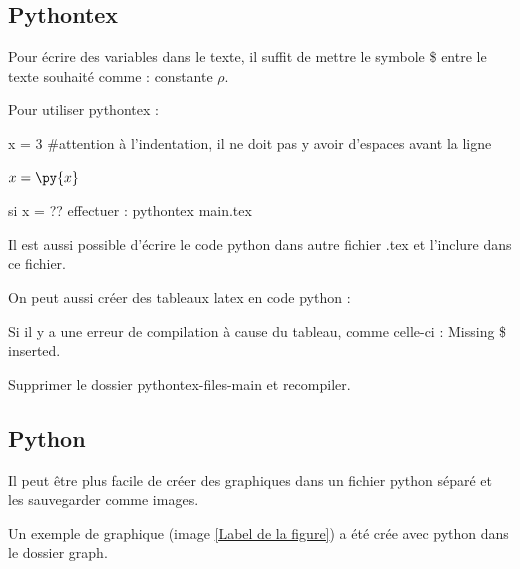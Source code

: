 \subsection{Pythontex}

Pour écrire des variables dans le texte, il suffit de mettre le symbole \$ entre le texte souhaité comme : constante $\rho$.

Pour utiliser pythontex :
\begin{pycode}
x = 3 #attention à l'indentation, il ne doit pas y avoir d'espaces avant la ligne
\end{pycode}
       
$x = \py{x}$

si x = ?? effectuer :
pythontex main.tex

Il est aussi possible d'écrire le code python dans autre fichier .tex
et l'inclure dans ce fichier.


On peut aussi créer des tableaux latex en code python :

\begin{figure}[H]
    \centering
\end{figure}

Si il y a une erreur de compilation à cause du tableau,
comme celle-ci : Missing \$ inserted.

Supprimer le dossier pythontex-files-main et recompiler.

\subsection{Python}
Il peut être plus facile de créer des graphiques dans un fichier python séparé
et les sauvegarder comme images.

Un exemple de graphique (image \ref{Label de la figure}) a été crée avec python dans le dossier graph.